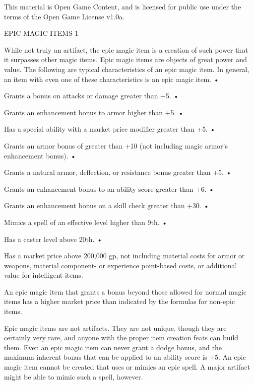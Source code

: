 \documentclass{article}
\begin{document}
This material is Open Game Content, and is licensed for public use under the terms 
of the Open Game License v1.0a.

{\LARGE{}EPIC MAGIC ITEMS 1}

\vspace{12pt}
While not truly an artifact, the epic magic item is a creation of such power that 
it surpasses other magic items\textit{. }Epic magic items are objects of great 
power and value. The following are typical characteristics of an epic magic item. 
In general, an item with even one of these characteristics is an epic magic item. 
• 

\parindent=3pt
Grants a bonus on attacks or damage greater than +5. • 

Grants an enhancement bonus to armor higher than +5. • 

\parindent=7pt
Has a special ability with a market price modifier greater than +5. • 

\parindent=3pt
Grants an armor bonus of greater than +10 (not including magic armor's enhancement 
bonus). • 

Grants a natural armor, deflection, or resistance bonus greater than +5. • 

\parindent=7pt
Grants an enhancement bonus to an ability score greater than +6. • 

\parindent=3pt
Grants an enhancement bonus on a skill check greater than +30. • 

Mimics a spell of an effective level higher than 9th. • 

\parindent=7pt
Has a caster level above 20th. • 

\parindent=3pt
Has a market price above 200,000 gp, not including material costs for armor or 
weapons, material component- or experience point-based costs, or additional value 
for intelligent items. 

\parindent=0pt
An epic magic item that grants a bonus beyond those allowed for normal magic items\textit{ 
}has a higher market price than indicated by the formulas for non-epic items. 

Epic magic items are not artifacts. They are not unique, though they are certainly 
very rare, and anyone with the proper item creation feats can build them. Even 
an epic magic item can never grant a dodge bonus, and the maximum inherent bonus 
that can be applied to an ability score is +5. An epic magic item cannot be created 
that uses or mimics an epic spell. A major artifact might be able to mimic such 
a spell, however. 
\end{document}
